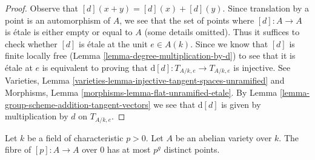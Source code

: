 \begin{proof}
Observe that $[d](x + y) = [d](x) + [d](y)$. Since translation by a
point is an automorphism of $A$, we see that the set of points where
$[d] : A \to A$ is \'etale is either empty or equal to $A$ (some details
omitted). Thus it suffices to check whether $[d]$ is \'etale at
the unit $e \in A(k)$. Since we know that $[d]$ is finite locally free
(Lemma \ref{lemma-degree-multiplication-by-d})
to see that it is \'etale at $e$ is equivalent to
proving that $\text{d}[d] : T_{A/k, e} \to T_{A/k, e}$ is injective. See
Varieties, Lemma \ref{varieties-lemma-injective-tangent-spaces-unramified} and
Morphisms, Lemma \ref{morphisms-lemma-flat-unramified-etale}.
By Lemma \ref{lemma-group-scheme-addition-tangent-vectors} we see that
$\text{d}[d]$ is given by multiplication by $d$ on $T_{A/k, e}$.
\end{proof}

\begin{lemma}
\label{lemma-abelian-variety-multiplication-by-p}
Let $k$ be a field of characteristic $p > 0$. Let $A$ be an abelian variety
over $k$. The fibre of $[p] : A \to A$ over $0$ has at most
$p^g$ distinct points.
\end{lemma}

